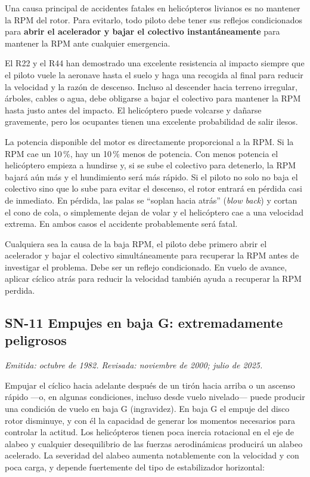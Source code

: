 Una causa principal de accidentes fatales en helicópteros livianos es no mantener la RPM del rotor. Para evitarlo, todo piloto debe tener sus reflejos condicionados para \textbf{abrir el acelerador y bajar el colectivo instantáneamente} para mantener la RPM ante cualquier emergencia.

El R22 y el R44 han demostrado una excelente resistencia al impacto siempre que el piloto vuele la aeronave hasta el suelo y haga una recogida al final para reducir la velocidad y la razón de descenso. Incluso al descender hacia terreno irregular, árboles, cables o agua, debe obligarse a bajar el colectivo para mantener la RPM hasta justo antes del impacto. El helicóptero puede volcarse y dañarse gravemente, pero los ocupantes tienen una excelente probabilidad de salir ilesos.

La potencia disponible del motor es directamente proporcional a la RPM. Si la RPM cae un 10\,\%, hay un 10\,\% menos de potencia. Con menos potencia el helicóptero empieza a hundirse y, si se sube el colectivo para detenerlo, la RPM bajará aún más y el hundimiento será más rápido. Si el piloto no solo no baja el colectivo sino que lo sube para evitar el descenso, el rotor entrará en pérdida casi de inmediato. En pérdida, las palas se ``soplan hacia atrás'' (\emph{blow back}) y cortan el cono de cola, o simplemente dejan de volar y el helicóptero cae a una velocidad extrema. En ambos casos el accidente probablemente será fatal.

Cualquiera sea la causa de la baja RPM, el piloto debe primero abrir el acelerador y bajar el colectivo simultáneamente para recuperar la RPM antes de investigar el problema. Debe ser un reflejo condicionado. En vuelo de avance, aplicar cíclico atrás para reducir la velocidad también ayuda a recuperar la RPM perdida.

\subsection*{SN-11 \quad Empujes en baja G: extremadamente peligrosos}
{\small\textit{Emitida: octubre de 1982. Revisada: noviembre de 2000; julio de 2025.}}

Empujar el cíclico hacia adelante después de un tirón hacia arriba o un ascenso rápido ---o, en algunas condiciones, incluso desde vuelo nivelado--- puede producir una condición de vuelo en baja G (ingravidez). En baja G el empuje del disco rotor disminuye, y con él la capacidad de generar los momentos necesarios para controlar la actitud. Los helicópteros tienen poca inercia rotacional en el eje de alabeo y cualquier desequilibrio de las fuerzas aerodinámicas producirá un alabeo acelerado. La severidad del alabeo aumenta notablemente con la velocidad y con poca carga, y depende fuertemente del tipo de estabilizador horizontal:

